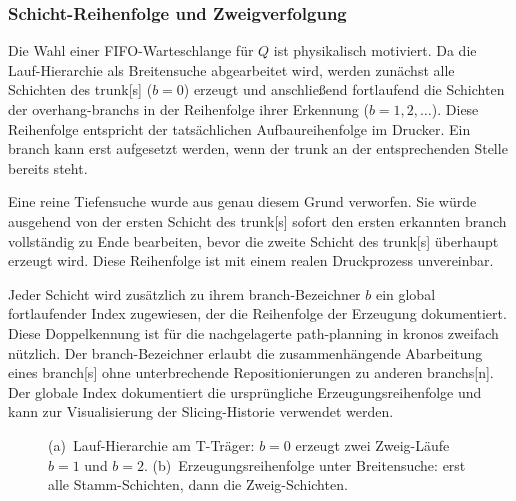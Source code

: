             \subsubsection{Schicht-Reihenfolge und Zweigverfolgung}\label{subsubsec:concept-base-layer-ordering}
                Die Wahl einer \ac{FIFO}-Warteschlange für $Q$ ist physikalisch motiviert.
                Da die Lauf-Hierarchie als Breitensuche abgearbeitet wird, werden zunächst alle Schichten des \gls{trunk}[s] ($b = 0$) erzeugt und anschließend fortlaufend die Schichten der \gls{overhang}-\glspl{branch} in der Reihenfolge ihrer Erkennung ($b = 1, 2, \dots$).
                Diese Reihenfolge entspricht der tatsächlichen Aufbaureihenfolge im Drucker.
                Ein \gls{branch} kann erst aufgesetzt werden, wenn der \gls{trunk} an der entsprechenden Stelle bereits steht.

                Eine reine Tiefensuche wurde aus genau diesem Grund verworfen.
                Sie würde ausgehend von der ersten Schicht des \gls{trunk}[s] sofort den ersten erkannten \gls{branch} vollständig zu Ende bearbeiten, bevor die zweite Schicht des \gls{trunk}[s] überhaupt erzeugt wird.
                Diese Reihenfolge ist mit einem realen Druckprozess unvereinbar.

                Jeder Schicht wird zusätzlich zu ihrem \gls{branch}-Bezeichner $b$ ein global fortlaufender Index zugewiesen, der die Reihenfolge der Erzeugung dokumentiert.
                Diese Doppelkennung ist für die nachgelagerte \gls{path-planning} in \ac{kronos} zweifach nützlich.
                Der \gls{branch}-Bezeichner erlaubt die zusammenhängende Abarbeitung eines \gls{branch}[s] ohne unterbrechende Repositionierungen zu anderen \glspl{branch}[n].
                Der globale Index dokumentiert die ursprüngliche Erzeugungsreihenfolge und kann zur Visualisierung der Slicing-Historie verwendet werden.

                \begin{figure}[ht]
                    \centering
                    
                    \caption[Lauf-Hierarchie und Schichtreihenfolge des Base-Algorithmus]{
                        (a)~Lauf-Hierarchie am T-Träger: $b=0$ erzeugt zwei Zweig-Läufe $b=1$ und $b=2$.
                        (b)~Erzeugungsreihenfolge unter Breitensuche: erst alle Stamm-Schichten, dann die Zweig-Schichten.
                    }
                    \label{fig:concept-base-runtree}
                \end{figure}


